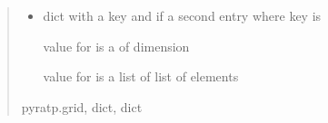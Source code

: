 \documentclass[letterpaper,10pt,english]{sphinxmanual}
\begin{document}
\begin{fulllineitems}
\begin{quote}
\begin{description}
\begin{itemize}
\begin{description}
\end{description}

\item {} \begin{description}
\sphinxAtStartPar
dict with a  key and if 
a second entry where key is 

\sphinxAtStartPar
value for  is a  of dimension

\sphinxAtStartPar
value for  is a list of  list of 
elements

\end{description}

\end{itemize}


\sphinxAtStartPar
pyratp.grid, dict, dict

\end{description}\end{quote}

\end{fulllineitems}

\end{document}
